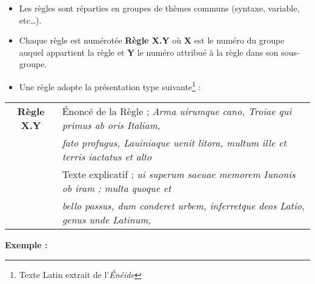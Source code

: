 \begin{itemize}
\item Les règles sont réparties en groupes de thèmes communs (syntaxe, variable, etc…).
\item Chaque règle est numérotée \textbf{Règle X.Y} où \textbf{X} est le numéro du groupe auquel appartient la règle et \textbf{Y} le numéro attribué à la règle dans son sous-groupe.
\item Une règle adopte la présentation type suivante\footnote{Texte Latin extrait de l’\textit{Énéide}} :
\end{itemize}

\medskip

\begin{center}
\begin{tabular}{|c l|}
\hline
\rowcolor{red!10}\textbf{Règle X.Y} & Énoncé de la Règle ; \textit{Arma uirumque cano, Troiae qui primus ab oris Italiam,} \\
\rowcolor{red!10} & \textit{fato profugus, Lauiniaque uenit litora, multum ille et terris iactatus et alto} \\ \hline
 & Texte explicatif ; \textit{ui superum saeuae memorem Iunonis ob iram ; multa quoque et} \\
 & \textit{bello passus, dum conderet urbem, inferretque deos Latio, genus unde Latinum,} \\ \hline
\hline
\end{tabular}
\end{center}

\medskip

\begin{large}
\textbf{Exemple :}
\end{large}
\medskip


\bigskip

\pagebreak